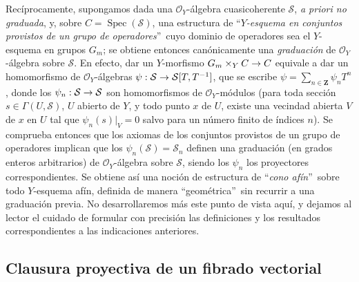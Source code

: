 \documentclass[oneside,10pt]{amsart}
\makeatletter
\newcommand{\ega@arrow}[2]{\mathchoice{#1}{#2}{#2}{#2}}
\renewcommand{\to}{\ega@arrow{\longrightarrow}{\rightarrow}}
\newcommand{\oldpage}[2][]{\marginnote{\normalfont\footnotesize\textbf{#1}~|~#2}\ignorespaces}
\let\EGAOriginalLabel\label
\renewcommand{\label}[1]{\phantomsection\EGAOriginalLabel{#1}}
\makeatother
\begin{document}
\begin{remark}[8.3.9]
Recíprocamente, supongamos dada una $\mathcal{O}_Y$-álgebra cuasicoherente $\mathcal{S}$, \emph{a priori no graduada}, y, sobre $C=\operatorname{Spec}(\mathcal{S})$, una estructura de \textquotedblleft\emph{$Y$-esquema en conjuntos provistos de un grupo de operadores}\textquotedblright\ cuyo dominio de operadores sea el $Y$-esquema en grupos $G_m$;
se obtiene entonces canónicamente una \emph{graduación} de $\mathcal{O}_Y$-álgebra sobre $\mathcal{S}$.
En efecto, dar un $Y$-morfismo $G_m\times_YC\to C$ equivale a dar un homomorfismo de $\mathcal{O}_Y$-álgebras $\psi:\mathcal{S}\to\mathcal{S}[T,T^{-1}]$, que se escribe $\psi=\sum_{n\in\mathbf{Z}}\psi_nT^n$, donde los $\psi_n:\mathcal{S}\to\mathcal{S}$ son homomorfismos de $\mathcal{O}_Y$-módulos (para toda sección $s\in\Gamma(U,\mathcal{S})$, $U$ abierto de $Y$, y todo punto $x$ de $U$, existe una vecindad abierta $V$ de $x$ en $U$ tal que $\psi_n(s)|_V=0$ salvo para un número finito de índices $n$).
Se comprueba entonces que los axiomas de los conjuntos provistos de un grupo de operadores implican que los $\psi_n(\mathcal{S})=\mathcal{S}_n$ definen una graduación (en grados enteros arbitrarios) de $\mathcal{O}_Y$-álgebra sobre $\mathcal{S}$, siendo los $\psi_n$ los proyectores correspondientes.
Se obtiene así una noción de estructura de \textquotedblleft\emph{cono afín}\textquotedblright\ sobre todo $Y$-esquema afín, definida de manera \textquotedblleft geométrica\textquotedblright\ sin recurrir a una graduación previa.
\oldpage[II]{168}
No desarrollaremos más este punto de vista aquí, y dejamos al lector el cuidado de formular con precisión las definiciones y los resultados correspondientes a las indicaciones anteriores.
\end{remark}
\subsection{Clausura proyectiva de un fibrado vectorial}
\label{subsection:II.8.4-fr}
\end{document}
